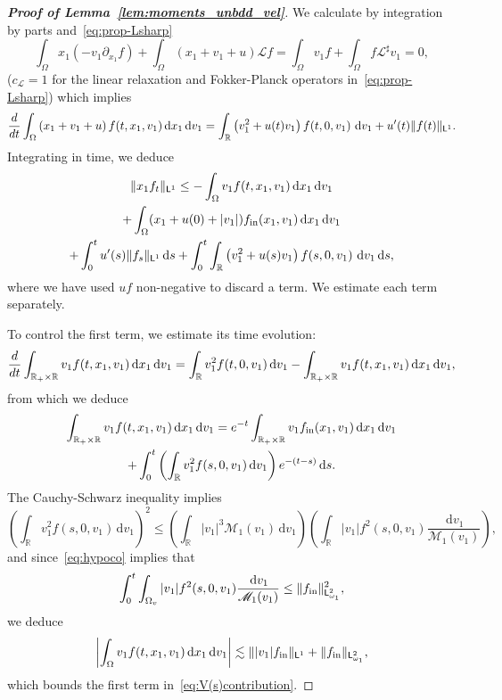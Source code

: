 \documentclass[10pt,a4paper]{amsart}
\def\LL{{\mathcal L}}
\def\MMM{{\mathscr M}}
\newcommand\R{{\mathbb R}}
\newcommand{\dd}{{\, \mathrm d}}
\newcommand{\dt}{\frac{{\rm d}}{{\rm d}t}}
\newcommand{\init}{\text{{\tiny {\rm in}}}}
\newcommand{\sfL}{\mathsf{L}}
\begin{document}
\begin{proof}[{\bf Proof of Lemma~\ref{lem:moments_unbdd_vel}}]
  We calculate by integration by parts and~\eqref{eq:prop-Lsharp}
  \begin{equation*}
    \int_\Omega x_1 (- v_1 \partial_{x_1} f )+ \int_\Omega (x_1+v_1+u)  \mathcal Lf =  \int_\Omega v_1  f + \int_\Omega f  \mathcal \LL^\sharp v_1 = 0,
  \end{equation*}
($c_\LL=1$ for the linear relaxation and Fokker-Planck operators in~\eqref{eq:prop-Lsharp}) which implies
  \begin{equation*}
    \dt \int_\Omega \left(x_1 + v_1 + u\right) f(t,x_1,v_1) \dd x_1 \dd v_1 = \int_{\R} \left( v_1^2 + u(t) v_1\right)   f(t,0,v_1) \,   \dd v_1 + u'(t) \| f(t) \|_{\sfL^{1}}.
  \end{equation*}
  Integrating in time, we deduce
  \begin{multline} \label{eq:V(s)contribution}
    \| x_1 f_t \|_{\sfL^{1}} \le - \int_\Omega v_1 f(t,x_1,v_1) \dd x_1 \dd v_1 \\ + \int_\Omega (x_1  + u(0) + |v_1|) f_\init(x_1,v_1) \dd x_1 \dd v_1
    \\
    + \int_0^t   u'(s) \| f_s \|_{\sfL^1} \dd s + 
    \int_0^t \int_{\R} \left( v_1^2 + u(s) v_1 \right) f(s,0,v_1) \,    \dd v_1 \dd s,
  \end{multline}
  where we have used $uf$ non-negative to discard a term. We estimate each term separately.

  To control the first term, we estimate its time evolution:
  \begin{align*}
    \dt \int_{\R_+ \times \R} v_1 f(t,x_1,v_1) \dd x_1 \dd v_1 = \int_{\R} v_1^2 f(t,0,v_1) \dd v_1 - \int_{\R_+ \times \R} v_1 f(t,x_1,v_1) \dd x_1 \dd v_1,
  \end{align*}
  from which we deduce
  \begin{multline*}
    \int_{\R_+ \times \R} v_1 f(t,x_1,v_1) \dd x_1 \dd v_1 = e^{-t} \int_{\R_+\times \R} v_1 f_\init(x_1,v_1) \dd x_1 \dd v_1 \\
    + \int_0^t \left( \int_{\R} v_1^2 f(s,0,v_1) \dd v_1 \right) e^{-(t-s)} \dd s.
  \end{multline*}
  The Cauchy-Schwarz inequality implies
  \begin{equation*}
    \left( \int_{\R} v_1^2 f(s,0,v_1) \dd v_1 \right)^2 \leq \left( \int_{\R} |v_1|^3 \MMM_1(v_1) \dd v_1 \right) \left( \int_{\R} \vert v_1 \vert f^2(s,0,v_1)\frac{\dd v_1}{\MMM_1(v_1)} \right) ,
  \end{equation*}
  and since~\eqref{eq:hypoco} implies that
  \begin{equation*}
    \int_0^t \int_{\Omega_v} \vert v_1 \vert f^2(s,0,v_1)\frac{\dd v_1}{\MMM_1(v_1)} \le \| f_\init \|_{\sfL^{2}_{\omega_1}}^2,
  \end{equation*}
  we deduce
  \begin{equation}
    \label{eq:mmt-bd-1}
    \left| \int_{\Omega} v_1 f(t,x_1,v_1) \dd x_1 \dd v_1 \right| \lesssim \| |v_1| f_\init \|_{\sfL^{1}} +  \| f_\init \|_{\sfL^{2}_{\omega_1}},
  \end{equation}
  which bounds the first term in~\eqref{eq:V(s)contribution}.


\end{proof}
\end{document}
